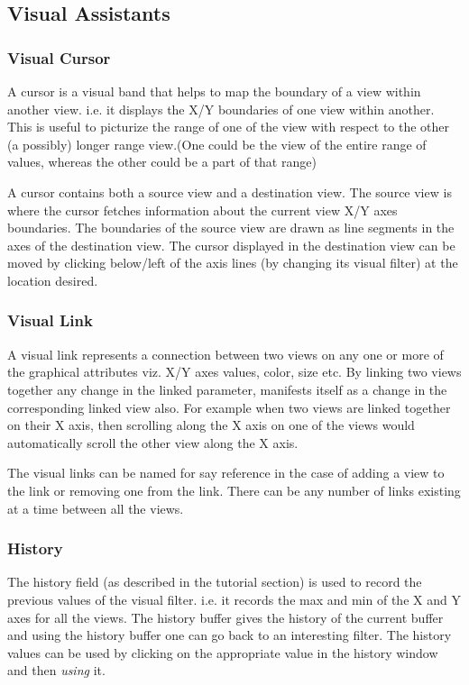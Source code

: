 \subsection{Visual Assistants}

\subsubsection{Visual Cursor}

A cursor is a visual band that helps to map the boundary of a view
within another view.  i.e. it displays the X/Y boundaries of one view
within another. This is useful to picturize the range of one of the
view with respect to the other (a possibly) longer range view.(One
could be the view of the entire range of values, whereas the other
could be a part of that range)

A cursor contains both a source view and a destination view. The
source view is where the cursor fetches information about the current
view X/Y axes boundaries. The boundaries of the source view are drawn
as line segments in the axes of the destination view. The cursor
displayed in the destination view can be moved by clicking below/left
of the axis lines (by changing its visual filter) at the location
desired.

\subsubsection{Visual Link}

A visual link represents a connection between two views on any one or
more of the graphical attributes viz. X/Y axes values, color, size
etc. By linking two views together any change in the linked
parameter, manifests itself as a change in the corresponding linked
view also. For example when two views are linked together on their X
axis, then scrolling along the X axis on one of the views would
automatically scroll the other view along the X axis.

The visual links can be named for say reference in the case of adding
a view to the link or removing one from the link. There can be any
number of links existing at a time between all the views.

\subsubsection{History}

The history field (as described in the tutorial section) is used to
record the previous values of the visual filter. i.e. it records the
max and min of the X and Y axes for all the views. The history buffer
gives the history of the current buffer and using the history buffer
one can go back to an interesting filter. The history values can be
used by clicking on the appropriate value in the history window and
then {\em using} it.


